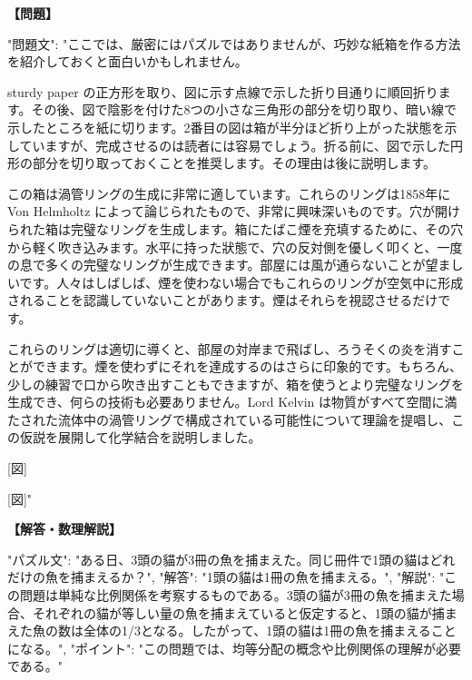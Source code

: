 \documentclass[10pt,a4paper,oneside,openany]{ltjsbook}
\begin{document}
\begin{tcolorbox}[colback=softblue,colframe=primaryblue,title=\textbf{第 163 問：THE PAPER BOX.},arc=2mm,boxrule=1pt,breakable]
\textbf{【問題】}\par\vspace{0.3em}
{
  "問題文": "ここでは、厳密にはパズルではありませんが、巧妙な紙箱を作る方法を紹介しておくと面白いかもしれません。

 sturdy paper の正方形を取り、図に示す点線で示した折り目通りに順回折ります。その後、図で陰影を付けた8つの小さな三角形の部分を切り取り、暗い線で示したところを紙に切ります。2番目の図は箱が半分ほど折り上がった狀態を示していますが、完成させるのは読者には容易でしょう。折る前に、図で示した円形の部分を切り取っておくことを推奨します。その理由は後に説明します。

この箱は渦管リングの生成に非常に適しています。これらのリングは1858年に Von Helmholtz によって論じられたもので、非常に興味深いものです。穴が開けられた箱は完璧なリングを生成します。箱にたばこ煙を充填するために、その穴から軽く吹き込みます。水平に持った狀態で、穴の反対側を優しく叩くと、一度の息で多くの完璧なリングが生成できます。部屋には風が通らないことが望ましいです。人々はしばしば、煙を使わない場合でもこれらのリングが空気中に形成されることを認識していないことがあります。煙はそれらを視認させるだけです。

これらのリングは適切に導くと、部屋の対岸まで飛ばし、ろうそくの炎を消すことができます。煙を使わずにそれを達成するのはさらに印象的です。もちろん、少しの練習で口から吹き出すこともできますが、箱を使うとより完璧なリングを生成でき、何らの技術も必要ありません。Lord Kelvin は物質がすべて空間に満たされた流体中の渦管リングで構成されている可能性について理論を提唱し、この仮説を展開して化学結合を説明しました。

[図]

[図]"

}
\tcblower
\textbf{【解答・数理解説】}\par\vspace{0.3em}
{
  "パズル文": "ある日、3頭の貓が3冊の魚を捕まえた。同じ冊件で1頭の貓はどれだけの魚を捕まえるか？",
  "解答": "1頭の貓は1冊の魚を捕まえる。",
  "解説": "この問題は単純な比例関係を考察するものである。3頭の貓が3冊の魚を捕まえた場合、それぞれの貓が等しい量の魚を捕まえていると仮定すると、1頭の貓が捕まえた魚の数は全体の1/3となる。したがって、1頭の貓は1冊の魚を捕まえることになる。",
  "ポイント": "この問題では、均等分配の概念や比例関係の理解が必要である。"
}
\end{tcolorbox}
\end{document}
